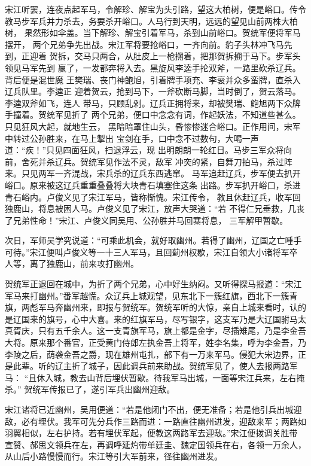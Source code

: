 宋江听罢，连夜点起军马，令解珍、解宝为头引路，望这大柏树，便是峪口。传令
教马步军兵并力杀去，务要杀开峪口。人马行到天明，远远的望见山前两株大柏树，
果然形如伞盖。当下解珍、解宝引着军马，杀到山前峪口。贺统军便将军马摆开，
两个兄弟争先出战。宋江军将要抢峪口，一齐向前。豹子头林冲飞马先到，正迎着
贺拆，交马只两合，从肚皮上一枪搠着，把那贺拆搠于马下。步军头领见马军先到
赢了，一发都奔将入去。黑旋风李逵手抡双斧，一路里砍杀辽兵。背后便是混世魔
王樊瑞、丧门神鲍旭，引着牌手项充、李衮并众多蛮牌，直杀入辽兵队里。李逵正
迎着贺云，抢到马下，一斧砍断马脚，当时倒了，贺云落马。李逵双斧如飞，连人
带马，只顾乱剁。辽兵正拥将来，却被樊瑞、鲍旭两下众牌手撞着。贺统军见折了
两个兄弟，便口中念念有词，作起妖法，不知道些甚么。只见狂风大起，就地生云，
黑暗暗罩住山头，昏惨惨迷合峪口。正作用间，宋军中转过公孙胜来，在马上掣出
宝剑在手，口中念不过数句，大喝一声道：“疾！”只见四面狂风，扫退浮云，现
出明朗朗一轮红日。马步三军众将向前，舍死并杀辽兵。贺统军见作法不灵，敌军
冲突的紧，自舞刀拍马，杀过阵来。只见两军一齐混战，宋兵杀的辽兵东西逃窜。
马军追赶辽兵，步军便去扒开峪口。原来被这辽兵重重叠叠将大块青石填塞住这条
出路。步军扒开峪口，杀进青石峪内。卢俊义见了宋江军马，皆称惭愧。宋江传令，
教且休赶辽兵，收军回独鹿山，将息被困人马。卢俊义见了宋江，放声大哭道：“若
不得仁兄垂救，几丧了兄弟性命！”宋江、卢俊义同吴用、公孙胜并马回寨将息，
三军解甲暂歇。

次日，军师吴学究说道：“可乘此机会，就好取幽州。若得了幽州，辽国之亡唾手
可待。”宋江便叫卢俊义等一十三人军马，且回蓟州权歇，宋江自领大小诸将军卒
人等，离了独鹿山，前来攻打幽州。

贺统军正退回在城中，为折了两个兄弟，心中好生纳闷。又听得探马报道：“宋江
军马来打幽州。”番军越慌。众辽兵上城观望，见东北下一簇红旗，西北下一簇青
旗，两彪军马奔幽州来，即报与贺统军。贺统军听的大惊，亲自上城来看时，认的
是辽国来的旗号，心中大喜。来的红旗军马，尽写银字，这支军乃是大辽国驸马太
真胥庆，只有五千余人。这一支青旗军马，旗上都是金字，尽插雉尾，乃是李金吾
大将。原来那个番官，正受黄门侍郎左执金吾上将军，姓李名集，呼为李金吾，乃
李陵之后，荫袭金吾之爵，现在雄州屯扎，部下有一万来军马。侵犯大宋边界，正
是此辈。听的辽主折了城子，因此调兵前来助战。贺统军见了，使人去报两路军马：
“且休入城，教去山背后埋伏暂歇。待我军马出城，一面等宋江兵来，左右掩杀。”
贺统军传报已了，遂引军兵出幽州迎敌。

宋江诸将已近幽州，吴用便道：“若是他闭门不出，便无准备；若是他引兵出城迎
敌，必有埋伏。我军可先分兵作三路而进：一路直往幽州进发，迎敌来军；两路如
羽翼相似，左右护持。若有埋伏军起，便教这两路军去迎敌。”宋江便拨调关胜带
宣赞、郝思文领兵在左，再调呼延灼带单廷圭、魏定国领兵在右，各领一万余人，
从山后小路慢慢而行。宋江等引大军前来，径往幽州进发。

